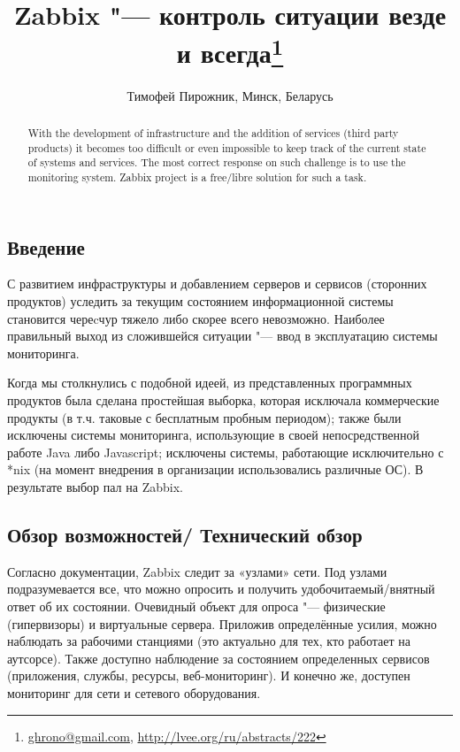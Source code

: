 \documentclass[10pt, a5paper]{article}
\begin{document}
\title{Zabbix "--- контроль ситуации везде и всегда\footnote{\url{ghrono@gmail.com}, \url{http://lvee.org/ru/abstracts/222}}}
\author{Тимофей Пирожник, Минск, Беларусь}
\maketitle
\begin{abstract}
With the development of infrastructure and the addition of services (third party products) it becomes too difficult or even impossible to keep track of the current state of systems and services. The most correct response on such challenge is to use the monitoring system. Zabbix project is a free/libre solution for such a task.
\end{abstract}
\subsection*{Введение}

С развитием инфраструктуры и добавлением серверов и сервисов (сторонних продуктов) уследить за текущим состоянием  информационной системы становится череcчур тяжело либо скорее всего невозможно. Наиболее правильный выход из сложившейся ситуации "--- ввод в эксплуатацию системы мониторинга.

Когда мы столкнулись с подобной идеей, из представленных программных продуктов была сделана простейшая выборка, которая исключала коммерческие продукты (в т.ч. таковые с бесплатным пробным периодом); также были исключены системы мониторинга, использующие в своей непосредственной работе Java либо Javascript; исключены системы, работающие исключительно с *nix (на момент внедрения в организации использовались различные ОС). В результате выбор пал на Zabbix.

\subsection*{Обзор возможностей/ Технический обзор}

Согласно документации, Zabbix следит за «узлами» сети. Под  узлами подразумевается все, что можно опросить и получить удобочитаемый/внятный ответ об их состоянии. Очевидный объект для опроса "--- физические (гипервизоры) и виртуальные сервера. Приложив определённые усилия, можно наблюдать за рабочими станциями (это актуально для тех, кто работает на аутсорсе). Также доступно наблюдение за состоянием определенных сервисов (приложения, службы, ресурсы,  веб-мониторинг). И конечно же, доступен мониторинг для сети и сетевого оборудования.
\end{document}
